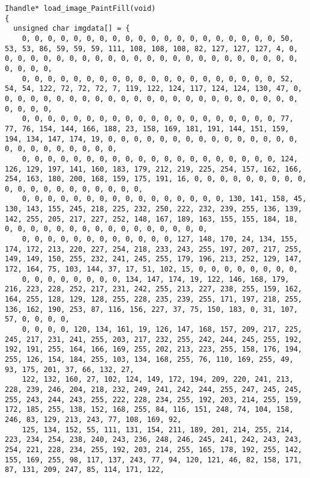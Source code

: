 \documentclass{ctexart}
\begin{document}
\begin{lstlisting}
Ihandle* load_image_PaintFill(void)
{
  unsigned char imgdata[] = {
    0, 0, 0, 0, 0, 0, 0, 0, 0, 0, 0, 0, 0, 0, 0, 0, 0, 0, 0, 0, 50, 53, 53, 86, 59, 59, 59, 111, 108, 108, 108, 82, 127, 127, 127, 4, 0, 0, 0, 0, 0, 0, 0, 0, 0, 0, 0, 0, 0, 0, 0, 0, 0, 0, 0, 0, 0, 0, 0, 0, 0, 0, 0, 0,
    0, 0, 0, 0, 0, 0, 0, 0, 0, 0, 0, 0, 0, 0, 0, 0, 0, 0, 0, 0, 52, 54, 54, 122, 72, 72, 72, 7, 119, 122, 124, 117, 124, 124, 130, 47, 0, 0, 0, 0, 0, 0, 0, 0, 0, 0, 0, 0, 0, 0, 0, 0, 0, 0, 0, 0, 0, 0, 0, 0, 0, 0, 0, 0,
    0, 0, 0, 0, 0, 0, 0, 0, 0, 0, 0, 0, 0, 0, 0, 0, 0, 0, 0, 0, 77, 77, 76, 154, 144, 166, 188, 23, 158, 169, 181, 191, 144, 151, 159, 194, 134, 147, 174, 19, 0, 0, 0, 0, 0, 0, 0, 0, 0, 0, 0, 0, 0, 0, 0, 0, 0, 0, 0, 0, 0, 0, 0, 0,
    0, 0, 0, 0, 0, 0, 0, 0, 0, 0, 0, 0, 0, 0, 0, 0, 0, 0, 0, 0, 124, 126, 129, 197, 141, 160, 183, 179, 212, 219, 225, 254, 157, 162, 166, 254, 163, 180, 200, 168, 159, 175, 191, 16, 0, 0, 0, 0, 0, 0, 0, 0, 0, 0, 0, 0, 0, 0, 0, 0, 0, 0, 0, 0,
    0, 0, 0, 0, 0, 0, 0, 0, 0, 0, 0, 0, 0, 0, 0, 0, 130, 141, 158, 45, 130, 143, 155, 245, 218, 225, 232, 250, 222, 232, 239, 255, 136, 139, 142, 255, 205, 217, 227, 252, 148, 167, 189, 163, 155, 155, 184, 18, 0, 0, 0, 0, 0, 0, 0, 0, 0, 0, 0, 0, 0, 0, 0, 0,
    0, 0, 0, 0, 0, 0, 0, 0, 0, 0, 0, 0, 127, 148, 170, 24, 134, 155, 174, 172, 213, 220, 227, 254, 218, 233, 243, 255, 197, 207, 217, 255, 149, 149, 150, 255, 232, 241, 245, 255, 179, 196, 213, 252, 129, 147, 172, 164, 75, 103, 144, 37, 17, 51, 102, 15, 0, 0, 0, 0, 0, 0, 0, 0,
    0, 0, 0, 0, 0, 0, 0, 0, 134, 147, 174, 19, 122, 146, 168, 179, 216, 223, 228, 252, 217, 231, 242, 255, 213, 227, 238, 255, 159, 162, 164, 255, 128, 129, 128, 255, 228, 235, 239, 255, 171, 197, 218, 255, 136, 162, 190, 253, 87, 116, 156, 227, 37, 75, 150, 183, 0, 31, 107, 57, 0, 0, 0, 0,
    0, 0, 0, 0, 120, 134, 161, 19, 126, 147, 168, 157, 209, 217, 225, 245, 217, 231, 241, 255, 203, 217, 232, 255, 242, 244, 245, 255, 192, 192, 191, 255, 164, 166, 169, 255, 202, 213, 223, 255, 158, 176, 194, 255, 126, 154, 184, 255, 103, 134, 168, 255, 76, 110, 169, 255, 49, 93, 175, 201, 37, 66, 132, 27,
    122, 132, 160, 27, 102, 124, 149, 172, 194, 209, 220, 241, 213, 228, 239, 246, 204, 218, 232, 249, 241, 242, 244, 255, 247, 245, 245, 255, 243, 244, 243, 255, 222, 228, 234, 255, 192, 203, 214, 255, 159, 172, 185, 255, 138, 152, 168, 255, 84, 116, 151, 248, 74, 104, 158, 246, 83, 129, 213, 243, 77, 108, 169, 92,
    125, 134, 152, 55, 111, 131, 154, 211, 189, 201, 214, 255, 214, 223, 234, 254, 238, 240, 243, 236, 248, 246, 245, 241, 242, 243, 243, 254, 221, 228, 234, 255, 192, 203, 214, 255, 165, 178, 192, 255, 142, 155, 169, 255, 98, 117, 137, 243, 77, 94, 120, 121, 46, 82, 158, 171, 87, 131, 209, 247, 85, 114, 171, 122,

\end{lstlisting}
\end{document}
